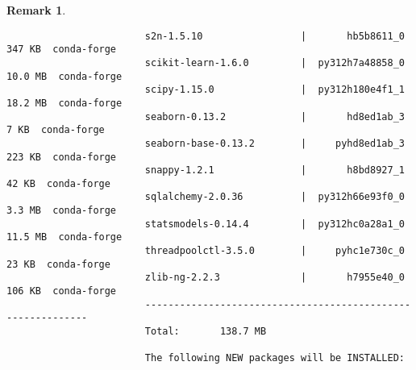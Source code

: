 \documentclass{article}
\newtheorem{remark}{Remark}
\begin{document}
\begin{enumerate}
\begin{itemize}
\begin{itemize}
\begin{itemize}
\begin{remark}
\begin{verbatim}
						s2n-1.5.10                 |       hb5b8611_0         347 KB  conda-forge
						scikit-learn-1.6.0         |  py312h7a48858_0        10.0 MB  conda-forge
						scipy-1.15.0               |  py312h180e4f1_1        18.2 MB  conda-forge
						seaborn-0.13.2             |       hd8ed1ab_3           7 KB  conda-forge
						seaborn-base-0.13.2        |     pyhd8ed1ab_3         223 KB  conda-forge
						snappy-1.2.1               |       h8bd8927_1          42 KB  conda-forge
						sqlalchemy-2.0.36          |  py312h66e93f0_0         3.3 MB  conda-forge
						statsmodels-0.14.4         |  py312hc0a28a1_0        11.5 MB  conda-forge
						threadpoolctl-3.5.0        |     pyhc1e730c_0          23 KB  conda-forge
						zlib-ng-2.2.3              |       h7955e40_0         106 KB  conda-forge
						------------------------------------------------------------
						Total:       138.7 MB
						
						The following NEW packages will be INSTALLED:
						

\end{verbatim}
\end{remark}
\end{itemize}
\end{itemize}
\end{itemize}
\end{enumerate}
\end{document}
